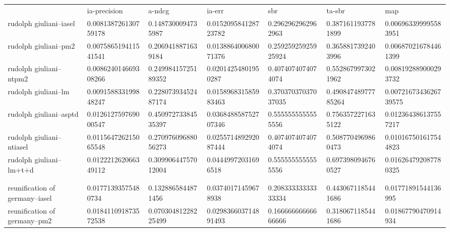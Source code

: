 \begin{table}[h]
\begin{tabular}{lllllll}
                                      & ia-precision          & a-ndcg              & ia-err               & sbr                 & ta-sbr              & map                   \\
rudolph giuliani--iasel               & 0.008138726130759178  & 0.1487300094735987  & 0.015209584128723782 & 0.2962962962962963  & 0.3871611937781899  & 0.006963399995583951  \\
rudolph giuliani--pm2                 & 0.007586519411541541  & 0.2069418871639184  & 0.013886400680071376 & 0.25925925925925924 & 0.3658817392403996  & 0.006870216784461399  \\
rudolph giuliani--ntpm2               & 0.008624014669308266  & 0.24998415725189352 & 0.02014254801950287  & 0.4074074074074074  & 0.5528679973021962  & 0.008192889000293732  \\
rudolph giuliani--lm                  & 0.009158833199848247  & 0.22807393452487174 & 0.015896831585983463 & 0.37037037037037035 & 0.49084748977785264 & 0.0072167343626739575 \\
rudolph giuliani--asptd               & 0.012612759769000547  & 0.45097273384535397 & 0.036848858752707346 & 0.5555555555555556  & 0.7563572271635122  & 0.012364386137557217  \\
rudolph giuliani--ntiasel             & 0.011564726215065548  & 0.27097609688056273 & 0.025571489292087444 & 0.4074074074074074  & 0.5087704969860473  & 0.010167501617544823  \\
rudolph giuliani--lm+t+d              & 0.012221262066349112  & 0.30990644757012004 & 0.04449972031696518  & 0.5555555555555556  & 0.6973980946760527  & 0.016264792087780325  \\
                                      &                       &                     &                      &                     &                     &                       \\
                                      &                       &                     &                      &                     &                     &                       \\
reunification of germany--iasel       & 0.01771393575480734   & 0.1328865844871456  & 0.03740171459678938  & 0.20833333333333334 & 0.4430671185441686  & 0.01771891544136995   \\
reunification of germany--pm2         & 0.018411091873572538  & 0.07030481228225499 & 0.029836603714891493 & 0.16666666666666666 & 0.3180671185441686  & 0.01867790470914934   \\

\end{tabular}
\end{table}
